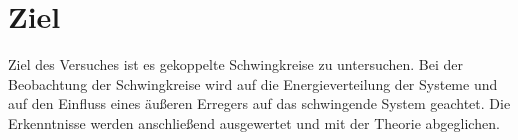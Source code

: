 \section{Ziel}
\label{sec:Ziel}
Ziel des Versuches ist es gekoppelte Schwingkreise zu untersuchen.
Bei der Beobachtung der Schwingkreise wird auf die Energieverteilung der Systeme und auf den Einfluss
eines äußeren Erregers auf das schwingende System geachtet.
Die Erkenntnisse werden anschließend ausgewertet und mit der Theorie abgeglichen.